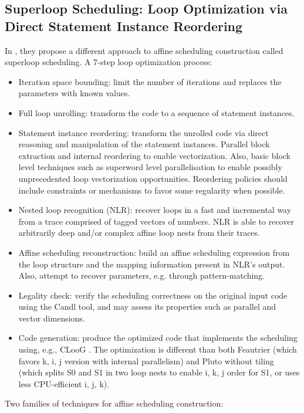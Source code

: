 \documentclass[a4paper, 11pt]{article}
\begin{document}
\subsection{Superloop Scheduling: Loop Optimization via Direct Statement Instance Reordering}
In \cite{bastoul2023superloop}, they propose a different approach to affine scheduling construction called superloop scheduling. A 7-step loop optimization process:
\begin{itemize}
    \item Iteration space bounding: limit the number of iterations and replaces the parameters with known values.
    \item Full loop unrolling: transform the code to a sequence of statement instances.
    \item Statement instance reordering: transform the unrolled code via direct reasoning and manipulation of the statement instances. Parallel block extraction and internal reordering to enable vectorization. Also, basic block level techniques such as superword level parallelisation \cite{Mendis_2018} to enable possibly unprecedented loop vectorization opportunities. Reordering policies should include constraints or mechanisms to favor some regularity when possible.
    \item Nested loop recognition (NLR): recover loops in a fast and incremental way \cite{ketterlin2008prediction} from a trace comprised of tagged vectors of numbers. NLR is able to recover arbitrarily deep and/or complex affine loop nests from their traces.
    \item Affine scheduling reconstruction: build an affine scheduling expression from the loop structure and the mapping information present in NLR’s output. Also, attempt to recover parameters, e.g. through pattern-matching.
    \item Legality check: verify the scheduling correctness on the original input code using the Candl tool, and may assess its properties such as parallel and vector dimensions.
    \item Code generation: produce the optimized code that implements the scheduling using, e.g., CLooG \cite{bastoul2004code}. The optimization is different than both Feautrier \cite{feautrier1992some} (which favors k, i, j version with internal parallelism) and Pluto without tiling \cite{bondhugula2008practical} (which splits S0 and S1 in two loop nests to enable i, k, j order for S1, or uses less CPU-efficient i, j, k).
\end{itemize}
Two families of techniques for affine scheduling construction:
\end{document}
